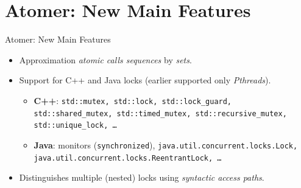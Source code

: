 \documentclass[%
    10pt, xcolor=pdflatex, hyperref={unicode}, aspectratio=169%
]{beamer}
\begin{document}
\section{Atomer: New Main Features}
\begin{frame}{Atomer: New Main Features}
    \begin{itemize}\setlength\itemsep{3em}
        \item
            \alert{Approximation} \emph{atomic calls sequences} by
            \emph{sets}.

        \item
            Support for \alert{C++ and Java locks} (earlier supported
            only \emph{Pthreads}).

            \smallskip

            \begin{itemize}\setlength\itemsep{1em}
                \item
                    \textbf{C++}: \texttt{std::mutex, std::lock,
                    std::lock\_guard, std::shared\_mutex,
                    std::timed\_mutex, std::recursive\_mutex,
                    std::unique\_lock, \ldots}

                \item
                    \textbf{Java}: monitors (\texttt{synchronized}),
                    \texttt{java.util.concurrent.locks.Lock,
                    java.util.concurrent.locks.ReentrantLock, \ldots}
            \end{itemize}

        \item
            Distinguishes \alert{multiple (nested) locks} using
            \emph{syntactic access paths}.
    \end{itemize}
\end{frame}


\end{document}
